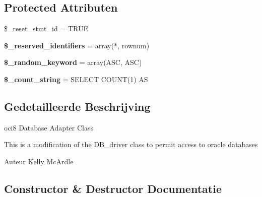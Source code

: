 \subsection*{Protected Attributen}
\begin{DoxyCompactItemize}
\item 
\mbox{\hyperlink{class_c_i___d_b__oci8__driver_ad21690f62001483fa1d13b9ee6143923}{\$\+\_\+reset\+\_\+stmt\+\_\+id}} = T\+R\+UE
\item 
\mbox{\label{class_c_i___d_b__oci8__driver_aa3298c4c62fbee8bb09f1b75b633fb0d}} 
{\bfseries \$\+\_\+reserved\+\_\+identifiers} = array(\textquotesingle{}$\ast$\textquotesingle{}, \textquotesingle{}rownum\textquotesingle{})
\item 
\mbox{\label{class_c_i___d_b__oci8__driver_a10213aa6e05f6d924d3277bb1d2fea00}} 
{\bfseries \$\+\_\+random\+\_\+keyword} = array(\textquotesingle{}A\+SC\textquotesingle{}, \textquotesingle{}A\+SC\textquotesingle{})
\item 
\mbox{\label{class_c_i___d_b__oci8__driver_a06c80bac2ecbd0557827e96949c23097}} 
{\bfseries \$\+\_\+count\+\_\+string} = \textquotesingle{}S\+E\+L\+E\+CT C\+O\+U\+NT(1) AS \textquotesingle{}
\end{DoxyCompactItemize}


\subsection{Gedetailleerde Beschrijving}
oci8 Database Adapter Class

This is a modification of the D\+B\+\_\+driver class to permit access to oracle databases

\begin{DoxyAuthor}{Auteur}
Kelly Mc\+Ardle 
\end{DoxyAuthor}


\subsection{Constructor \& Destructor Documentatie}
\mbox{\label{class_c_i___d_b__oci8__driver_a9162320adff1a1a4afd7f2372f753a3e}} 

